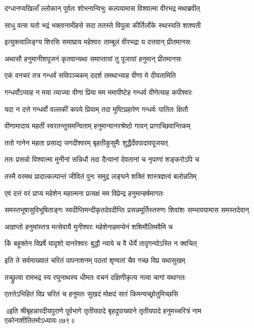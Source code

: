 \twolineshloka
{दग्धानप्यखिलाँ ल्लोकान् पूर्वतः शोभनान्विभुः}
{कल्पयामास विश्वात्मा वीरभद्र मथाब्रवीत्}%

\twolineshloka
{साधु वत्स यतो भद्रं भक्तानामीहसे सदा}
{ततस्ते विपुला कीर्तिर्लोके स्थास्यति शाश्वती}%

\twolineshloka
{इत्युक्त्वालिङ्ग्य शिरसि समाघ्राय महेश्वरः}
{ताम्बूलं वीरभद्रा य दत्तवान् प्रीतमानसः}%

\twolineshloka
{अथासौ हनुमानीशपूजनं कृतवान्यथा}
{समाप्तायां तु पूजायां हनुमान् प्रीतमानसः}%

\twolineshloka
{एकं वनचरं तत्र गन्धर्वं सविपञ्चकम्}
{ददर्श तमथाभ्याह वीणा मे दीयतामिति}%

\twolineshloka
{गन्धर्वोऽप्याह न मया त्याज्या वीणा प्रिया मम}
{ममापीष्टेह गन्धर्व वीणेत्याह कपीश्वरः}%

\twolineshloka
{यदा न दत्ते गन्धर्वो वल्लकीं कपये प्रियाम्}
{तदा मुष्टिप्रहारेण गन्धर्वः पातितः क्षितौ}%

\twolineshloka
{वीणामादाय महतीं स्वरतन्तुसमन्विताम्}
{हनुमान्वानरश्रेष्ठो गायन् प्रागाच्छिवान्तिकम्}%

\twolineshloka
{ततो गानेन महता प्रसाद्य जगदीश्वरम्}
{बृहतीकुसुमैः शुद्धैर्देवपादावपूजयत्}%

\twolineshloka
{ततः प्रसन्नो विश्वात्मा मुनीनां सन्निधौ तदा}
{दैत्यानां देवतानां च नृपाणां शङ्करोऽपि च}%

\twolineshloka
{तस्मै वरमथ प्रादात्कल्पान्तं जीवितं पुनः}
{समुद्र लङ्घने शक्तिं शास्त्रज्ञत्वं बलोन्नतिम्}%

\twolineshloka
{एवं दत्तं वरं प्राप्य महेशेन महात्मना}
{प्रत्यक्षं मम विप्रेन्द्र हनुमान्हर्षमागतः}%

\twolineshloka
{समस्तभूषासुविभूषिताङ्गः स्वदीप्तिमन्दीकृतदेवदीप्तिः}
{प्रसन्नमूर्तिस्तरुणः शिवांशः सम्भावयामास समस्तदेवान्}%

\twolineshloka
{आज्ञप्तो हनुमांस्तत्र मत्सेवायै मुनीश्वरः}
{महेशेनाहमप्येनं शशिमौलिमवैमि च}%

\twolineshloka
{किं बहूक्तेन विप्रर्षे यादृशो वानरेश्वरः}
{बुद्धौ न्याये च वै धैर्ये तादृगन्योऽस्ति न क्वचित्}%

\twolineshloka
{इति ते सर्वमाख्यातं चरितं पापनाशनम्}
{पठतां शृण्वतां चैव गच्छ विप्र यथासुखम्}%

\twolineshloka
{तच्छ्रुत्वा रामभद्र स्य रघुनाथस्य धीमतः}
{वचनं दक्षिणीकृत्य नत्वा चागां यथागतः}%

\twolineshloka
{एतत्तेऽभिहितं विप्र चरितं च हनूमतः}
{सुखदं मोक्षदं सारं किमन्यच्छ्रोतुमिच्छसि}%

॥इति श्रीबृहन्नारदीयपुराणे पूर्वभागे तृतीयपादे बृहदुपाख्याने तृतीयपादे हनुमच्चरित्रं नाम एकोनाशीतितमोऽध्यायः॥७९॥

\closesection